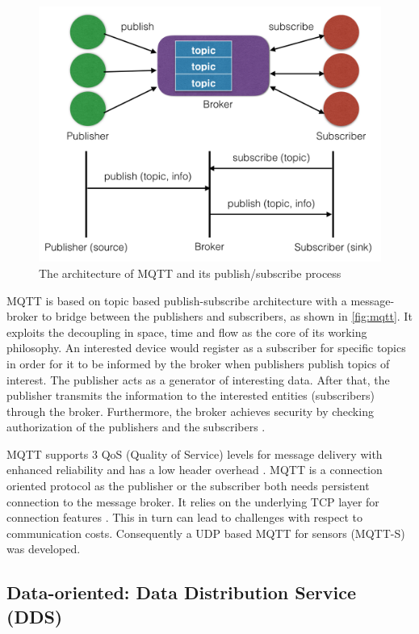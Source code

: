 \begin{figure}[!htbp]
\centering
\includegraphics[scale = 0.55]{mqtt.png}
\caption{The architecture of MQTT and its publish/subscribe process}
\label{fig:mqtt}
\end{figure}

MQTT is based on topic based publish-subscribe architecture with a message-broker to bridge between the publishers and subscribers, as shown in \autoref{fig:mqtt}. It exploits the decoupling in space, time and flow as the core of its working philosophy. An interested device would register as a subscriber for specific topics in order for it to be informed by the broker when publishers publish topics of interest. The publisher acts as a generator of interesting data. After that, the publisher transmits the information to the interested entities (subscribers) through the broker. Furthermore, the broker achieves security by checking authorization of the publishers and the subscribers \cite{4554519}\cite{6504105}.

MQTT supports 3 QoS (Quality of Service) levels for message delivery with enhanced reliability and has a low header overhead \cite{mqtt_protocol}. MQTT is a connection oriented protocol as the publisher or the subscriber both needs persistent connection to the message broker. It relies on the underlying TCP layer for connection features \cite{6504105}. This in turn can lead to challenges with respect to communication costs. Consequently a UDP based MQTT for sensors (MQTT-S) \cite{4554519} was developed.

\subsection{Data-oriented: Data Distribution Service (DDS)}

